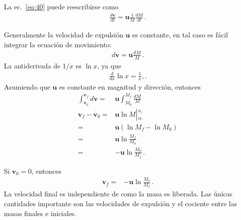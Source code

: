 La ec.~\eqref{eq:40} puede reescribirse como
\begin{align}
  \label{eq:m41}
  \frac{d\mathbf{v}}{dt}=\mathbf{u}\frac{1}{M}\frac{dM}{dt}\,.
\end{align}


Generalmente la velocidad de expulsión $\mathbf{u}$ es constante, en tal caso es fácil integrar la ecuación de movimiento:
\begin{align}
{d\mathbf{v}}=\mathbf{u}\frac{dM}{M}\,.
\end{align}
La antiderivada de $1/x$ es $\ln x$, ya que
\begin{align}
  \frac{d}{dx}\ln x=\frac{1}{x},.
\end{align}
Asumiendo que $\mathbf{u}$ es constante en magnitud y dirección,
entonces
\begin{align}
  \int_{\mathbf{v}_0}^{\mathbf{v}_f}{d\mathbf{v}}=&\mathbf{u}\int_{M_0}^{M_f}\frac{dM}{M}\nonumber\\
\mathbf{v}_f-\mathbf{v}_0=&\mathbf{u}\ln M\left|_{{}_{M_0}}^{{}^{M_f}}\right.\nonumber\\
=&\mathbf{u}\left(\ln M_f-\ln M_0\right)\nonumber\\
=&\mathbf{u}\ln\frac{M_f}{M_0}\nonumber\\
=&-\mathbf{u}\ln\frac{M_0}{M_f}\,.
\end{align}

Si $\mathbf{v}_0=0$, entonces
\begin{align}
  \mathbf{v}_f=&-\mathbf{u}\ln\frac{M_0}{M_f}\,.
\end{align}
La velocidad final es independiente de como la masa es liberada. Las únicas cantidades importante son las velocidades de expulsión y el cociente entre las masas finales e iniciales.

